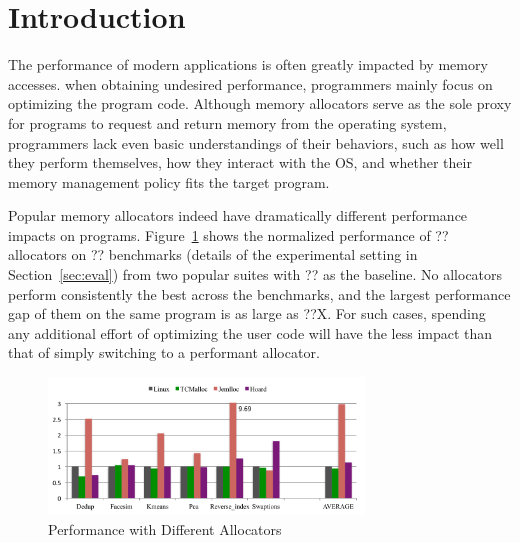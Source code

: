 

\section{Introduction}


The performance of modern applications is often greatly impacted by memory accesses. when obtaining undesired performance, programmers mainly focus on optimizing the program code. Although memory allocators serve as the sole proxy for programs to request and return memory from the operating system, programmers lack even basic understandings of their behaviors, such as how well they perform themselves, how they interact with the OS, and whether their memory management policy fits the target program. 

Popular memory allocators indeed have dramatically different performance impacts on programs. Figure~\ref{fig:motivation} shows the normalized performance of ?? allocators on ?? benchmarks (details of the experimental setting in Section~\ref{sec:eval}) from two popular suites with ?? as the baseline. No allocators perform consistently the best across the benchmarks, and the largest performance gap of them on the same program is as large as ??X. For such cases, spending any additional effort of optimizing the user code will have the less impact than that of simply switching to a performant allocator.

\begin{figure}[!ht]
\centering
\includegraphics[width=3.3in]{figures/motivation}
\caption{Performance with Different Allocators\label{fig:motivation}}
\end{figure}

